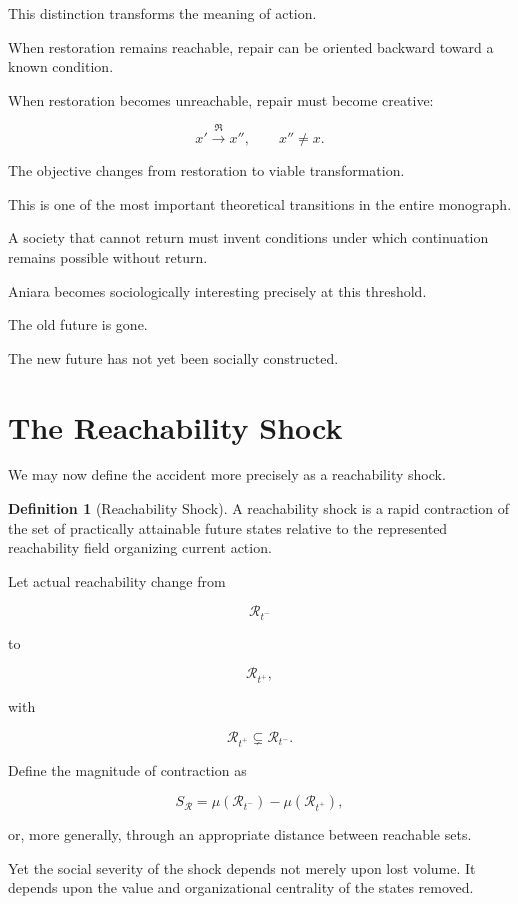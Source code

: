 \documentclass[11pt,oneside]{book}
\theoremstyle{definition}
\newtheorem{definition}[theorem]{Definition}
\theoremstyle{remark}
\newcommand{\R}{\mathcal{R}}
\newcommand{\Repair}{\mathfrak{R}}
\begin{document}
This distinction transforms the meaning of action.

When restoration remains reachable, repair can be oriented backward toward a known condition.

When restoration becomes unreachable, repair must become creative:

\[
x'
\xrightarrow{\Repair}
x'',
\qquad
x''\neq x.
\]

The objective changes from restoration to viable transformation.

This is one of the most important theoretical transitions in the entire monograph.

A society that cannot return must invent conditions under which continuation remains possible without return.

Aniara becomes sociologically interesting precisely at this threshold.

The old future is gone.

The new future has not yet been socially constructed.

\section{The Reachability Shock}

We may now define the accident more precisely as a reachability shock.

\begin{definition}[Reachability Shock]
A reachability shock is a rapid contraction of the set of practically attainable future states relative to the represented reachability field organizing current action.
\end{definition}

Let actual reachability change from

\[
\R_{t^-}
\]

to

\[
\R_{t^+},
\]

with

\[
\R_{t^+}\subsetneq\R_{t^-}.
\]

Define the magnitude of contraction as

\[
S_{\R}
=
\mu(\R_{t^-})
-
\mu(\R_{t^+}),
\]

or, more generally, through an appropriate distance between reachable sets.

Yet the social severity of the shock depends not merely upon lost volume. It depends upon the value and organizational centrality of the states removed.
\end{document}
